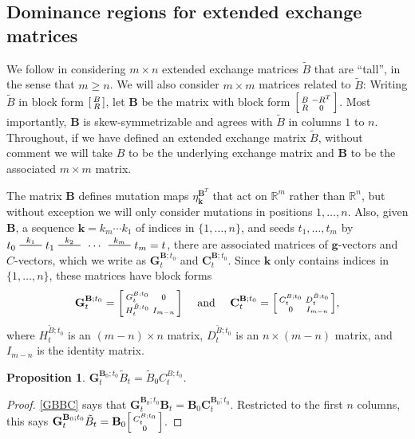 \documentclass{amsart}
\newtheorem{proposition}{Proposition}[section]
\theoremstyle{definition}
\theoremstyle{remark}
\numberwithin{equation}{section}
\newcommand{\reals}{\mathbb R}
\newcommand{\edge}{\,\,\rule[2.7pt]{20pt}{0.5pt}\,\,}
\newcommand{\set}[1]{{\lbrace #1 \rbrace}}
\newcommand{\GG}{{\mathbf G}}
\newcommand{\CC}{{\mathbf C}}
\newcommand{\0}{{\mathbf{0}}}
\newcommand{\g}{\mathbf{g}}
\newcommand{\kk}{\mathbf{k}}
\newcommand{\tB}{{\tilde{B}}}
\newcommand{\BB}{\mathbf{B}}
\newcommand{\R}{\mathcal{R}}
\renewcommand{\H}{\mathcal{H}}
\begin{document}
\subsection{Dominance regions for extended exchange matrices}\label{ext sec}
We follow \cite{FZ07} in considering $m\times n$ extended exchange matrices $\tB$ that are ``tall'', in the sense that $m\ge n$.
We will also consider $m\times m$ matrices related to $\tB$:
Writing $\tB$ in block form $\begin{bsmallmatrix}B\\R\end{bsmallmatrix}$, let $\BB$ be the matrix with block form $\begin{bsmallmatrix}B&-R^T\\R&0\end{bsmallmatrix}$.
Most importantly, $\BB$ is skew-symmetrizable and agrees with $\tB$ in columns $1$ to $n$.
Throughout, if we have defined an extended exchange matrix $\tB$, without comment we will take $B$ to be the underlying exchange matrix and $\BB$ to be the associated $m\times m$ matrix.

The matrix $\BB$ defines mutation maps $\eta_\kk^{\BB^T}$ that act on $\reals^m$ rather than $\reals^n$, but without exception we will only consider mutations in positions $1,\ldots,n$.
Also, given $\BB$, a sequence $\kk=k_m\cdots k_1$ of indices in $\set{1,\ldots,n}$, and seeds $t_1,\ldots,t_m$ by $t_0\overset{k_1}{\edge}t_1\overset{k_2}{\edge}\,\cdots\,\overset{k_m}{\edge}t_m=t$, there are associated matrices of $\g$-vectors and $C$-vectors, which we write as $\GG_t^{\BB;t_0}$ and $\CC_t^{\BB;t_0}$.
Since $\kk$ only contains indices in $\set{1,\ldots,n}$, these matrices have block forms
\[
\GG_t^{\BB;t_0}=\begin{bsmallmatrix}G_t^{B;t_0}&0\\H_t^{\tB;t_0}&I_{m-n}\end{bsmallmatrix}
\quad\text{ and }\quad
\CC_t^{\BB;t_0}=\begin{bsmallmatrix}C_t^{B;t_0}&D_t^{\tB;t_0}\\0&I_{m-n}\end{bsmallmatrix},
\]
where $H_t^{\tB;t_0}$ is an $(m-n)\times n$ matrix, $D_t^{\tB;t_0}$ is an $n\times(m-n)$ matrix, and $I_{m-n}$ is the identity matrix.

\begin{proposition}\label{GBBC ext}
$\GG_t^{\BB_0;t_0}\tB_t=\tB_0C_t^{B;t_0}$.
\end{proposition}
\begin{proof}
\cref{GBBC} says that $\GG_t^{\BB_0;t_0}\BB_t=\BB_0\CC_t^{\BB_0;t_0}$.
Restricted to the first $n$ columns, this says $\GG_t^{\BB_0;t_0}\tB_t=\BB_0\begin{bsmallmatrix}C_t^{B;t_0}\\0\end{bsmallmatrix}$.
\end{proof}
\end{document}
